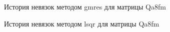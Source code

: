 \begin{figure}
    \renewcommand{\figurename}{Рисунок}
    \caption{История невязок методом gmres для матрицы Qa8fm}
    \label{fig:image}
\end{figure}

\begin{figure}
    \renewcommand{\figurename}{Рисунок}
    \caption{История невязок методом lsqr для матрицы Qa8fm}
    \label{fig:image}
\end{figure}

